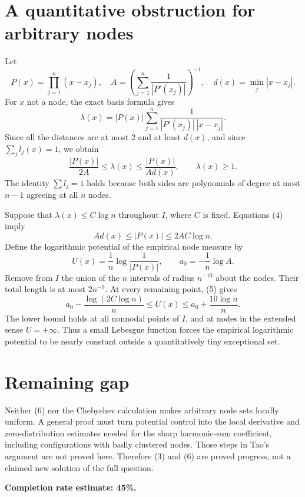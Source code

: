 \documentclass[11pt]{article}
\begin{document}
\section*{A quantitative obstruction for arbitrary nodes}
Let
\[
 P(x)=\prod_{j=1}^n(x-x_j),\quad
 A=\left(\sum_{j=1}^n\frac1{|P'(x_j)|}\right)^{-1},\quad
 d(x)=\min_j|x-x_j|.
\]
For $x$ not a node, the exact basis formula gives
\[
 \lambda(x)=|P(x)|\sum_{j=1}^n\frac1{|P'(x_j)|\,|x-x_j|}.
\]
Since all the distances are at most $2$ and at least $d(x)$, and since $\sum_jl_j(x)=1$, we obtain
\[
 \frac{|P(x)|}{2A}\le\lambda(x)\le\frac{|P(x)|}{A d(x)},
 \qquad\lambda(x)\ge1.\tag{4}
\]
The identity $\sum l_j=1$ holds because both sides are polynomials of degree at most $n-1$ agreeing at all $n$ nodes.

Suppose that $\lambda(x)\le C\log n$ throughout $I$, where $C$ is fixed. Equations (4) imply
\[
 A d(x)\le|P(x)|\le2AC\log n.\tag{5}
\]
Define the logarithmic potential of the empirical node measure by
\[
 U(x)=\frac1n\log\frac1{|P(x)|},\qquad a_0=-\frac1n\log A.
\]
Remove from $I$ the union of the $n$ intervals of radius $n^{-10}$ about the nodes. Their total length is at most $2n^{-9}$. At every remaining point, (5) gives
\[
 a_0-\frac{\log(2C\log n)}n
 \le U(x)\le a_0+\frac{10\log n}{n}.\tag{6}
\]
The lower bound holds at all nonnodal points of $I$, and at nodes in the extended sense $U=+\infty$. Thus a small Lebesgue function forces the empirical logarithmic potential to be nearly constant outside a quantitatively tiny exceptional set.

\section*{Remaining gap}
Neither (6) nor the Chebyshev calculation makes arbitrary node sets locally uniform. A general proof must turn potential control into the local derivative and zero-distribution estimates needed for the sharp harmonic-sum coefficient, including configurations with badly clustered nodes. Those steps in Tao's argument are not proved here. Therefore (3) and (6) are proved progress, not a claimed new solution of the full question.

\textbf{Completion rate estimate: 45\%.}
\end{document}
